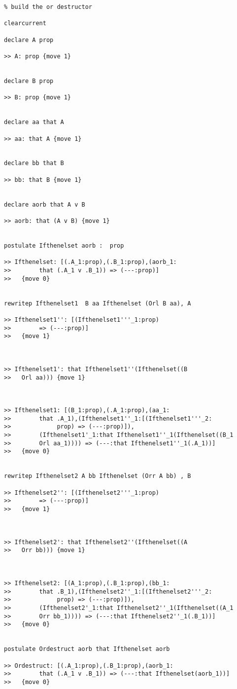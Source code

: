 \documentclass[12pt]{article}
\begin{document}
\begin{verbatim}
% build the or destructor

clearcurrent

declare A prop

>> A: prop {move 1}


declare B prop

>> B: prop {move 1}


declare aa that A

>> aa: that A {move 1}


declare bb that B

>> bb: that B {move 1}


declare aorb that A v B

>> aorb: that (A v B) {move 1}


postulate Ifthenelset aorb :  prop

>> Ifthenelset: [(.A_1:prop),(.B_1:prop),(aorb_1:
>>        that (.A_1 v .B_1)) => (---:prop)]
>>   {move 0}


rewritep Ifthenelset1  B aa Ifthenelset (Orl B aa), A

>> Ifthenelset1'': [(Ifthenelset1'''_1:prop) 
>>        => (---:prop)]
>>   {move 1}



>> Ifthenelset1': that Ifthenelset1''(Ifthenelset((B 
>>   Orl aa))) {move 1}



>> Ifthenelset1: [(B_1:prop),(.A_1:prop),(aa_1:
>>        that .A_1),(Ifthenelset1''_1:[(Ifthenelset1'''_2:
>>             prop) => (---:prop)]),
>>        (Ifthenelset1'_1:that Ifthenelset1''_1(Ifthenelset((B_1 
>>        Orl aa_1)))) => (---:that Ifthenelset1''_1(.A_1))]
>>   {move 0}


rewritep Ifthenelset2 A bb Ifthenelset (Orr A bb) , B

>> Ifthenelset2'': [(Ifthenelset2'''_1:prop) 
>>        => (---:prop)]
>>   {move 1}



>> Ifthenelset2': that Ifthenelset2''(Ifthenelset((A 
>>   Orr bb))) {move 1}



>> Ifthenelset2: [(A_1:prop),(.B_1:prop),(bb_1:
>>        that .B_1),(Ifthenelset2''_1:[(Ifthenelset2'''_2:
>>             prop) => (---:prop)]),
>>        (Ifthenelset2'_1:that Ifthenelset2''_1(Ifthenelset((A_1 
>>        Orr bb_1)))) => (---:that Ifthenelset2''_1(.B_1))]
>>   {move 0}


postulate Ordestruct aorb that Ifthenelset aorb

>> Ordestruct: [(.A_1:prop),(.B_1:prop),(aorb_1:
>>        that (.A_1 v .B_1)) => (---:that Ifthenelset(aorb_1))]
>>   {move 0}



\end{verbatim}
\end{document}
